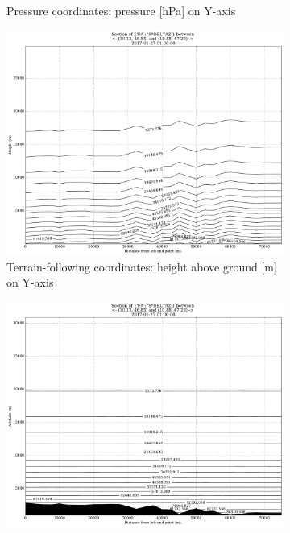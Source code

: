 \begin{figure}[H]
\begin{subfigure}{0.45\textwidth}
    \caption{\footnotesize{Pressure coordinates: pressure [hPa] on Y-axis}}
    \label{fig:PvsP}
    \end{subfigure}
    \vspace{1cm}
    \begin{subfigure}{0.45\textwidth}
    \includegraphics[trim={0cm 0cm  0cm  1.8cm },clip,width=\textwidth]{graphics/coordinates/PvsHeight.pdf}
    \caption{ \footnotesize{Terrain-following  coordinates: height above ground [m] on Y-axis}}
    \label{fig:PvsH}
    \end{subfigure}
    \hspace{1cm}
    \begin{subfigure}{0.45\textwidth}
    \includegraphics[trim={0cm 0cm  0cm  1.8cm },clip,width=\textwidth]{graphics/coordinates/PvsALtitude.pdf}

\end{subfigure}
\end{figure}
